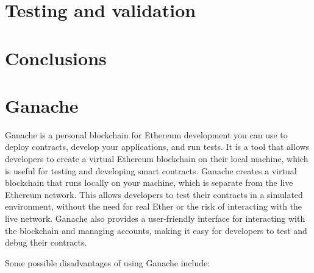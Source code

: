 \documentclass[target=mst,aauheader=]{thud}
\begin{document}
\chapter{Testing and validation}

\chapter{Conclusions}

\appendix


\chapter{Ganache}
Ganache is a personal blockchain for Ethereum development you can use to deploy contracts, develop your applications, and run tests. It is a tool that allows developers to create a virtual Ethereum blockchain on their local machine, which is useful for testing and developing smart contracts. Ganache creates a virtual blockchain that runs locally on your machine, which is separate from the live Ethereum network. This allows developers to test their contracts in a simulated environment, without the need for real Ether or the risk of interacting with the live network. Ganache also provides a user-friendly interface for interacting with the blockchain and managing accounts, making it easy for developers to test and debug their contracts.\par

Some possible disadvantages of using Ganache include:
\end{document}
